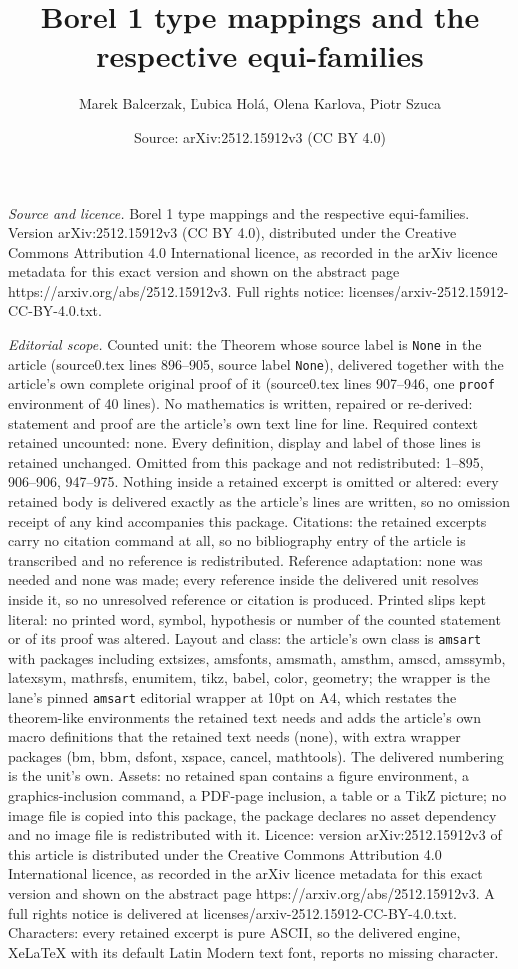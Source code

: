 \documentclass[10pt,a4paper]{amsart}
\title[Borel 1 type mappings and the respective equi-families]{Borel 1 type mappings and the respective equi-families}
\author{Marek Balcerzak, \v{L}ubica Hol\'a, Olena Karlova, Piotr Szuca}
\date{Source: arXiv:2512.15912v3 (CC BY 4.0)}
\begin{document}
\maketitle

\noindent\emph{Source and licence.} Borel 1 type mappings and the respective equi-families. Version arXiv:2512.15912v3 (CC BY 4.0), distributed under the Creative Commons Attribution 4.0 International licence, as recorded in the arXiv licence metadata for this exact version and shown on the abstract page https://arxiv.org/abs/2512.15912v3. Full rights notice: licenses/arxiv-2512.15912-CC-BY-4.0.txt.\par\smallskip

\noindent\textit{Editorial scope.} Counted unit: the Theorem whose source label is \texttt{None} in the article (source0.tex lines 896--905, source label \texttt{None}), delivered together with the article's own complete original proof of it (source0.tex lines 907--946, one \texttt{proof} environment of 40 lines). No mathematics is written, repaired or re-derived: statement and proof are the article's own text line for line. Required context retained uncounted: none. Every definition, display and label of those lines is retained unchanged. Omitted from this package and not redistributed: 1--895, 906--906, 947--975. Nothing inside a retained excerpt is omitted or altered: every retained body is delivered exactly as the article's lines are written, so no omission receipt of any kind accompanies this package. Citations: the retained excerpts carry no citation command at all, so no bibliography entry of the article is transcribed and no reference is redistributed. Reference adaptation: none was needed and none was made; every reference inside the delivered unit resolves inside it, so no unresolved reference or citation is produced. Printed slips kept literal: no printed word, symbol, hypothesis or number of the counted statement or of its proof was altered. Layout and class: the article's own class is \texttt{amsart} with packages including extsizes, amsfonts, amsmath, amsthm, amscd, amssymb, latexsym, mathrsfs, enumitem, tikz, babel, color, geometry; the wrapper is the lane's pinned \texttt{amsart} editorial wrapper at 10pt on A4, which restates the theorem-like environments the retained text needs and adds the article's own macro definitions that the retained text needs (none), with extra wrapper packages (bm, bbm, dsfont, xspace, cancel, mathtools). The delivered numbering is the unit's own. Assets: no retained span contains a figure environment, a graphics-inclusion command, a PDF-page inclusion, a table or a TikZ picture; no image file is copied into this package, the package declares no asset dependency and no image file is redistributed with it. Licence: version arXiv:2512.15912v3 of this article is distributed under the Creative Commons Attribution 4.0 International licence, as recorded in the arXiv licence metadata for this exact version and shown on the abstract page https://arxiv.org/abs/2512.15912v3. A full rights notice is delivered at licenses/arxiv-2512.15912-CC-BY-4.0.txt. Characters: every retained excerpt is pure ASCII, so the delivered engine, XeLaTeX with its default Latin Modern text font, reports no missing character.
\end{document}
